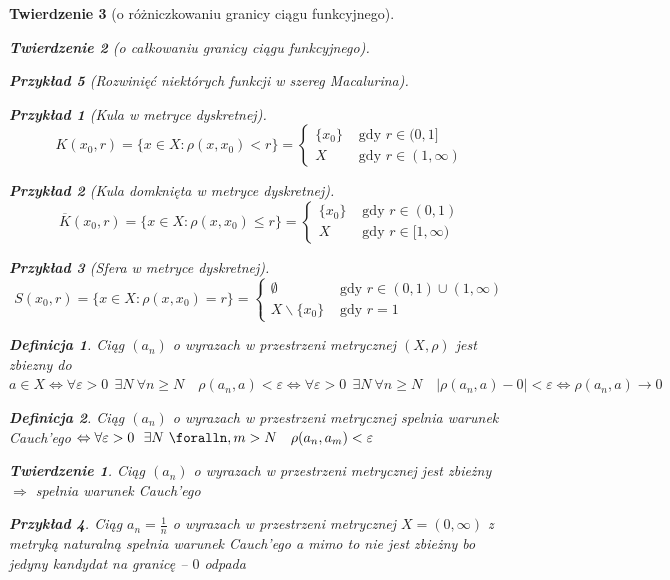 \documentclass[12pt,a4paper]{article}
\newtheorem{tw}{Twierdzenie}
\newtheorem{przyklad}{Przykład}
\theoremstyle{definition}
\newtheorem{df}{Definicja}
\begin{document}
\begin{tw}[o różniczkowaniu granicy ciągu funkcyjnego]
\begin{tw}[o całkowaniu granicy ciągu funkcyjnego]
\begin{przyklad}[Rozwinięć niektórych funkcji w szereg Macalurina]
\begin{przyklad}[Kula w metryce dyskretnej]
$$K(x_0, r) = \{x\in X: \rho(x,x_0) < r\} = \begin{cases}
	\{x_0\} &\text{ gdy } r\in (0,1]\\
	X &\text{ gdy } r\in (1, \infty)
\end{cases}$$
\end{przyklad}
\begin{przyklad}[Kula domknięta w metryce dyskretnej]
$$\overline{K}(x_0, r) = \{x\in X: \rho(x,x_0) \leqslant r\} = \begin{cases}
	\{x_0\} &\text{ gdy } r\in (0,1)\\
	X &\text{ gdy } r\in [1, \infty)
\end{cases}$$
\end{przyklad}
\begin{przyklad}[Sfera w metryce dyskretnej]
$$S(x_0, r) = \{x\in X: \rho(x,x_0) = r\} = \begin{cases}
	\emptyset &\text{ gdy } r\in (0,1) \cup (1,\infty)\\
	X\smallsetminus\{x_0\} &\text{ gdy } r=1
\end{cases}$$
\end{przyklad}

\begin{df}
Ciąg $(a_n)$ o wyrazach w przestrzeni metrycznej $(X, \rho)$ jest zbiezny do $a\in X \Leftrightarrow \forall\varepsilon >0~~ \exists N ~ \forall n \geqslant N \quad \rho(a_n, a) < \varepsilon \Leftrightarrow \forall\varepsilon >0~~ \exists N ~ \forall n \geqslant N \quad |\rho(a_n, a) - 0| < \varepsilon \Leftrightarrow \rho(a_n, a) \rightarrow 0$
\end{df}

\begin{df}
Ciąg $(a_n)$ o wyrazach w przestrzeni metrycznej spelnia warunek Cauch'ego $\Leftrightarrow \forall \varepsilon >0 ~~ \exists N ~ \foralln,m > N \quad \rho(a_n, a_m) < \varepsilon$
\end{df}

\begin{tw}
Ciąg $(a_n)$ o wyrazach w przestrzeni metrycznej jest zbieżny $\Rightarrow$ spełnia warunek Cauch'ego
\end{tw}

\begin{przyklad}
Ciąg $a_n = \frac{1}{n}$ o wyrazach w przestrzeni metrycznej $X = (0, \infty)$ z metryką naturalną spełnia warunek Cauch'ego a mimo to nie jest zbieżny bo jedyny kandydat na granicę -- $0$ odpada
\end{przyklad}


\end{przyklad}
\end{tw}
\end{tw}
\end{document}
